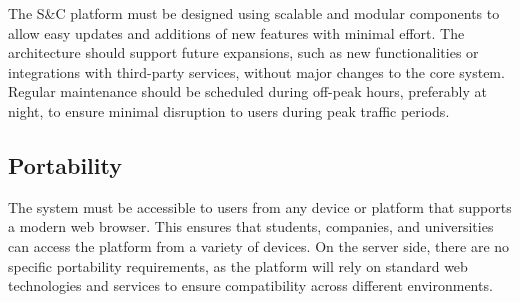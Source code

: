The S\&C platform must be designed using scalable and modular components
to allow easy updates and additions of new features with minimal effort.
The architecture should support future expansions, such as new
functionalities or integrations with third-party services, without major
changes to the core system. Regular maintenance should be scheduled
during off-peak hours, preferably at night, to ensure minimal disruption
to users during peak traffic periods.


\subsection{Portability}
\label{subsec:portability}%


The system must be accessible to users from any device or platform that
supports a modern web browser. This ensures that students, companies,
and universities can access the platform from a variety of devices. On
the server side, there are no specific portability requirements, as the
platform will rely on standard web technologies and services to ensure
compatibility across different environments.